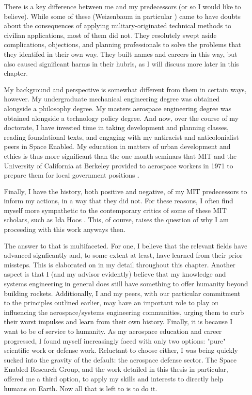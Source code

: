 There is a key difference between me and my predecessors (or so I would like to believe). While some of these  (Weizenbaum in particular \cite{lightWarfareWelfareDefense2005}) came to have doubts about the consequences of applying military-originated technical methods to civilian applications, most of them did not. They resolutely swept aside complications, objections, and planning professionals to solve the problems that they identifed in their own way. They built names and careers in this way, but also caused significant harms in their hubris, as I will discuss more later in this chapter.

My background and perspective is somewhat different from them in certain ways, however. My undergraduate mechanical engineering degree was obtained alongside a philosophy degree. My masters aerospace engineering degree was obtained alongside a technology policy degree. And now, over the course of my doctorate, I have invested time in taking development and planning classes, reading foundational texts, and engaging with my antiracist and anticolonialist peers in Space Enabled. My education in matters of urban development and ethics is thus more significant than the one-month seminars that MIT and the University of California at Berkeley provided to aerospace workers in 1971 to prepare them for local government positions \cite{lightWarfareWelfareDefense2005}. 

Finally, I have the history, both positive and negative, of my MIT predecessors to inform my actions, in a way that they did not. For these reasons, I often find myself more sympathetic to the contemporary critics of some of these MIT scholars, such as Ida Hoos \cite{hoosSystemsAnalysisPublic1983}. This, of course, raises the question of why I am proceeding with this work anyways then.	

The answer to that is multifaceted. For one, I believe that the relevant fields have advanced signficantly and, to some extent at least, have learned from their prior missteps. This is elaborated on in my detail throughout this chapter. Another aspect is that I (and my advisor evidently) believe that my knowledge and systems engineering in general does still have something to offer humanity beyond building rockets. Additionally, I and my peers, with our particular commitment to the principles outlined earlier, may have an important role to play on influencing the aerospace/systems engineering communities, urging them to curb their worst impulses and learn from their own history. Finally, it is because I want to be of service to humanity. As my aerospace education and career progressed, I found myself increasingly faced with only two options: "pure" scientific work or defense work. Reluctant to choose either, I was being quickly sucked into the gravity of the default: the aerospace defense sector. The Space Enabled Research Group, and the work detailed in this thesis in particular, offered me a third option, to apply my skills and interests to directly help humans on Earth. Now all that is left to is to do it.


